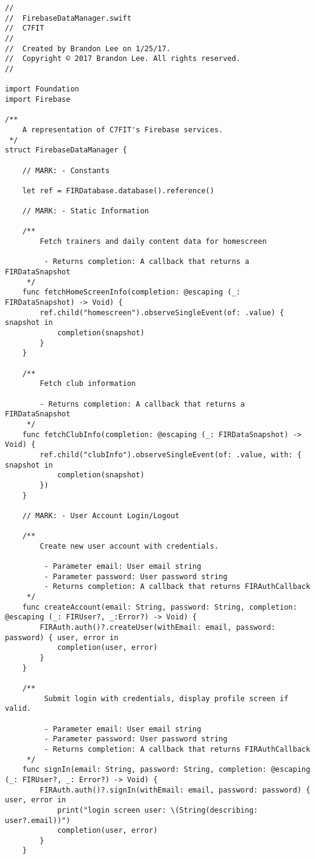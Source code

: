 \begin{verbatim}
//
//  FirebaseDataManager.swift
//  C7FIT
//
//  Created by Brandon Lee on 1/25/17.
//  Copyright © 2017 Brandon Lee. All rights reserved.
//

import Foundation
import Firebase

/**
    A representation of C7FIT's Firebase services.
 */
struct FirebaseDataManager {

    // MARK: - Constants

    let ref = FIRDatabase.database().reference()

    // MARK: - Static Information

    /**
        Fetch trainers and daily content data for homescreen
     
         - Returns completion: A callback that returns a FIRDataSnapshot
     */
    func fetchHomeScreenInfo(completion: @escaping (_: FIRDataSnapshot) -> Void) {
        ref.child("homescreen").observeSingleEvent(of: .value) { snapshot in
            completion(snapshot)
        }
    }

    /**
        Fetch club information

        - Returns completion: A callback that returns a FIRDataSnapshot
     */
    func fetchClubInfo(completion: @escaping (_: FIRDataSnapshot) -> Void) {
        ref.child("clubInfo").observeSingleEvent(of: .value, with: { snapshot in
            completion(snapshot)
        })
    }

    // MARK: - User Account Login/Logout

    /**
        Create new user account with credentials.
     
         - Parameter email: User email string
         - Parameter password: User password string
         - Returns completion: A callback that returns FIRAuthCallback
     */
    func createAccount(email: String, password: String, completion: @escaping (_: FIRUser?, _:Error?) -> Void) {
        FIRAuth.auth()?.createUser(withEmail: email, password: password) { user, error in
            completion(user, error)
        }
    }

    /**
         Submit login with credentials, display profile screen if valid.
         
         - Parameter email: User email string
         - Parameter password: User password string
         - Returns completion: A callback that returns FIRAuthCallback
     */
    func signIn(email: String, password: String, completion: @escaping (_: FIRUser?, _: Error?) -> Void) {
        FIRAuth.auth()?.signIn(withEmail: email, password: password) { user, error in
            print("login screen user: \(String(describing: user?.email))")
            completion(user, error)
        }
    }


\end{verbatim}
